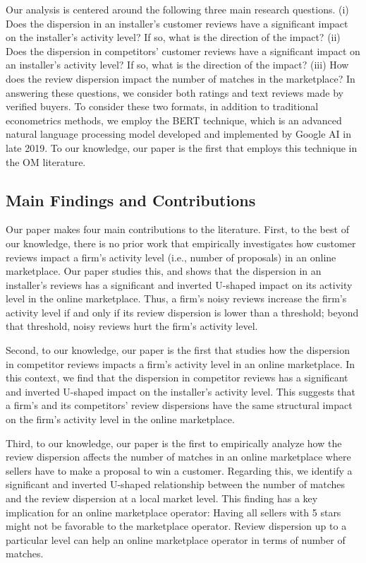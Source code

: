 \documentclass[msom,blindrev]{informs3}
\begin{document}
Our analysis is centered around the following three main research questions. (i) Does the dispersion in an installer's customer reviews have a significant impact on the installer's activity level?  If so, what is the direction of the impact? (ii) Does the dispersion in competitors' customer reviews have a significant impact on an installer's activity level? If so, what is the direction of the impact? (iii) How does the review dispersion impact the number of matches in the marketplace?  In answering these questions, we consider both  ratings and text reviews made by verified buyers. To consider these two formats, in addition to traditional econometrics methods, we employ the BERT technique, which is an advanced natural language processing model developed and implemented by Google AI in late 2019. To our knowledge, our paper is the first that employs this technique in the OM literature.


\subsection{Main Findings and Contributions}

Our paper makes four main contributions to the literature. First, to the best of our knowledge, there is no prior work that empirically investigates how customer reviews impact a firm's activity level (i.e., number of proposals) in an online marketplace. Our paper studies this, and shows that the dispersion in an installer's reviews has a significant and inverted U-shaped impact on its activity level in the online marketplace. Thus, a firm's noisy reviews increase the firm's activity level if and only if its review dispersion is lower than a threshold; beyond that threshold, noisy reviews hurt the firm's activity level.


Second, to our knowledge, our paper is the first that studies how the dispersion in competitor reviews impacts a firm's activity level in an online marketplace. In this context, we find that the dispersion in competitor reviews has a significant and inverted U-shaped impact on the installer's activity level. This suggests that a firm's  and  its competitors' review dispersions have the same structural impact on the firm's activity level in the online marketplace.

Third, to our knowledge, our paper is the first to empirically analyze how the review dispersion affects the number of matches in an online marketplace where sellers have to make a proposal to win a customer. Regarding this, we identify a significant and inverted U-shaped relationship between the number of matches and the review dispersion at a local market level. This finding has a key implication for an online marketplace operator: Having all sellers with 5 stars might not be favorable to the marketplace operator. Review dispersion up to a particular level can help an online marketplace operator in terms of number of matches.
\end{document}
